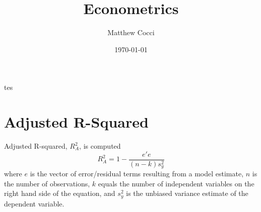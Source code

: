 \documentclass[a4paper,12pt]{scrartcl}
\author{Matthew Cocci}
\title{Econometrics}
\date{\today}
\begin{document}
\maketitle


tes


\appendix

\section{Adjusted R-Squared}

Adjusted R-squared, $R^2_A$, is computed 
\[ R^2_A = 1 - \frac{e'e }{(n-k) s_y^2} \]
where $e$ is the vector of error/residual terms resulting from a 
model estimate,
$n$ is the number of observations, $k$ equals the number of 
independent variables on the right hand side of the equation, and
$s_y^2$ is the unbiased variance estimate of the dependent variable.
\end{document}
